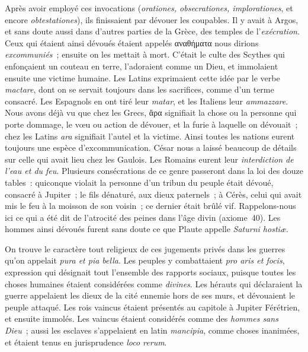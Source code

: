 \documentclass[french,twoside]{book} %
\begin{document}
Après avoir employé ces invocations ({\itshape orationes, obsecrationes, implorationes}, et encore {\itshape obtestationes}), ils finissaient par dévouer les coupables. Il y avait à Argos, et sans doute aussi dans d’autres parties de la Grèce, des temples de l’{\itshape exécration}. Ceux qui étaient ainsi dévoués étaient appelés αναθήματα nous dirions {\itshape excommuniés} ; ensuite on les mettait à mort. C’était le culte des Scythes qui enfonçaient un couteau en terre, l’adoraient comme un Dieu, et immolaient ensuite une victime humaine. Les Latins exprimaient cette idée par le verbe {\itshape mactare}, dont  on se servait toujours dans les sacrifices, comme d’un terme consacré. Les Espagnols en ont tiré leur {\itshape matar}, et les Italiens leur {\itshape ammazzare}. Nous avons déjà vu que chez les Grecs, ἄρα signifiait la chose ou la personne qui porte dommage, le vœu ou action de dévouer, et la furie à laquelle on dévouait ; chez les Latins {\itshape ara} signifiait l’autel et la victime. Ainsi toutes les nations eurent toujours une espèce d’excommunication. César nous a laissé beaucoup de détails sur celle qui avait lieu chez les Gaulois. Les Romains eurent leur {\itshape interdiction de l’eau et du feu}. Plusieurs consécrations de ce genre passeront dans la loi des douze tables : quiconque violait la personne d’un tribun du peuple était dévoué, consacré à Jupiter ; le fils dénaturé, aux dieux paternels ; à Cérès, celui qui avait mis le feu à la moisson de son voisin ; ce dernier était brûlé vif. Rappelons-nous ici ce qui a été dit de l’atrocité des peines dans l’âge divin (axiome 40). Les hommes ainsi dévoués furent sans doute ce que Plaute appelle \emph{{\itshape Saturni hostiæ}}.\par
On trouve le caractère tout religieux de ces jugements privés dans les guerres qu’on appelait {\itshape pura et pia bella}. Les peuples y combattaient {\itshape pro aris et focis}, expression qui désignait tout l’ensemble des rapports sociaux, puisque toutes les choses humaines étaient considérées comme {\itshape divines}. Les hérauts qui déclaraient la guerre appelaient les dieux de la cité ennemie hors de ses murs, et dévouaient le peuple attaqué. Les rois vaincus étaient présentés au capitole à Jupiter Férétrien, et ensuite immolés.  Les vaincus étaient considérés comme des {\itshape hommes sans Dieu} ; aussi les esclaves s’appelaient en latin {\itshape mancipia}, comme choses inanimées, et étaient tenus en jurisprudence {\itshape loco rerum}.\par
\end{document}
